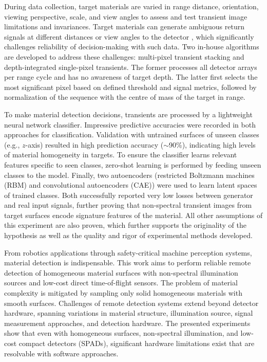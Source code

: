 \documentclass[12pt,a4paper,oneside]{report}
\begin{document}
During data collection, target materials are varied in range distance, orientation, viewing perspective, scale, and view angles to assess and test transient image limitations and invariances. Target materials can generate ambiguous return signals at different distances or view angles to the detector \cite{tontini2024}, which significantly challenges reliability of decision-making with such data. Two in-house algorithms are developed to address these challenges: multi-pixel transient stacking and depth-integrated single-pixel transients. The former processes all detector arrays per range cycle and has no awareness of target depth. The latter first selects the most significant pixel based on defined threshold and signal metrics, followed by normalization of the sequence with the centre of mass of the target in range.

To make material detection decisions, transients are processed by a lightweight neural network classifier. Impressive predictive accuracies were recorded in both approaches for classification. Validation with untrained surfaces of unseen classes (e.g., $z$-axis) resulted in high prediction accuracy ($\sim$90\%), indicating high levels of material homogeneity in targets. To ensure the classifier learns relevant features specific to seen classes, zero-shot learning is performed by feeding unseen classes to the model. Finally, two autoencoders (restricted Boltzmann machines (RBM) \cite{ackley1985} and convolutional autoencoders (CAE)) were used to learn latent spaces of trained classes. Both successfully reported very low losses between generator and real input signals, further proving that non-spectral transient images from target surfaces encode signature features of the material. All other assumptions of this experiment are also proven, which further supports the originality of the hypothesis as well as the quality and rigor of experimental methods developed.

From robotics applications through safety-critical machine perception systems, material detection is indispensable. This work aims to perform reliable remote detection of homogeneous material surfaces with non-spectral illumination sources and low-cost direct time-of-flight sensors. The problem of material complexity is mitigated by sampling only solid homogeneous materials with smooth surfaces. Challenges of remote detection systems extend beyond detector hardware, spanning variations in material structure, illumination source, signal measurement approaches, and detection hardware. The presented experiments show that even with homogeneous surfaces, non-spectral illumination, and low-cost compact detectors (SPADs), significant hardware limitations exist that are resolvable with software approaches.
\end{document}
